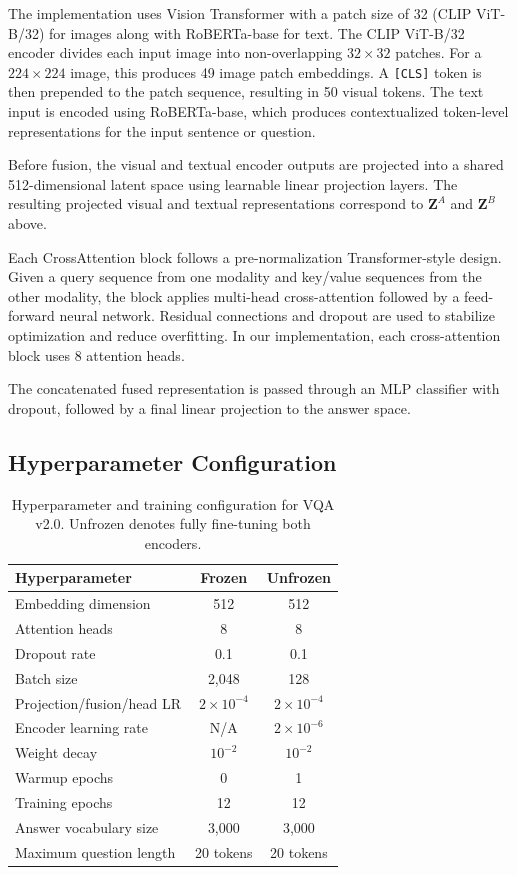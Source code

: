 \documentclass[conference]{IEEEtran}
\begin{document}
The implementation uses Vision Transformer with a patch size of 32 (CLIP ViT-B/32) for images along with RoBERTa-base for text. The CLIP ViT-B/32 encoder divides each input image into non-overlapping $32 \times 32$ patches. For a $224 \times 224$ image, this produces 49 image patch embeddings. A \texttt{[CLS]} token is then prepended to the patch sequence, resulting in 50 visual tokens. The text input is encoded using RoBERTa-base, which produces contextualized token-level representations for the input sentence or question.

Before fusion, the visual and textual encoder outputs are projected into a shared 512-dimensional latent space using learnable linear projection layers.  The resulting projected visual and textual representations correspond to $\mathbf{Z}^{A}$ and $\mathbf{Z}^{B}$ above.

Each CrossAttention block follows a pre-normalization Transformer-style design. Given a query sequence from one modality and key/value sequences from the other modality, the block applies multi-head cross-attention followed by a feed-forward neural network. Residual connections and dropout are used to stabilize optimization and reduce overfitting. In our implementation, each cross-attention block uses 8 attention heads.

\noindent The concatenated fused representation is passed through an MLP classifier with dropout, followed by a final linear projection to the answer space. 

\subsection{Hyperparameter Configuration}

\begin{table}[t]
\centering
\caption{Hyperparameter and training configuration for VQA v2.0. Unfrozen denotes fully fine-tuning both encoders.}
\label{tab:hparams}
\small
\setlength{\tabcolsep}{4pt}
\renewcommand{\arraystretch}{1.05}
\begin{tabular}{p{}cc}
\hline
\textbf{Hyperparameter} & \textbf{Frozen} & \textbf{Unfrozen} \\
\hline
Embedding dimension & 512 & 512 \\
Attention heads & 8 & 8 \\
Dropout rate & 0.1 & 0.1 \\
Batch size & 2,048 & 128 \\
Projection/fusion/head LR & $2\times10^{-4}$ & $2\times10^{-4}$ \\
Encoder learning rate & N/A& $2\times10^{-6}$ \\
Weight decay & $10^{-2}$ & $10^{-2}$ \\
Warmup epochs & 0 & 1 \\
Training epochs & 12 & 12 \\
Answer vocabulary size & 3,000 & 3,000 \\
Maximum question length & 20 tokens & 20 tokens \\
\hline
\end{tabular}
\end{table}
\end{document}
